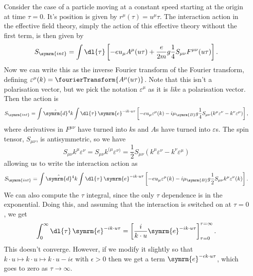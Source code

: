 \documentclass[fleqn]{NotesClass}
\newcommand{\e}{\symrm{e}}
\newcommand{\interaction}{{\symrm{int}}}
\newcommand{\dhat}[1]{\hat{\symrm{d}}{#1}}
\newcommand{\bohrMagneton}{\mu_{\symrm{B}}}
\begin{document}
    Consider the case of a particle moving at a constant speed starting at the origin at time \(\tau = 0\).
    It's position is given by \(r^\mu(\tau) = u^\mu \tau\).
    The interaction action in the effective field theory, simply the action of this effective theory without the first term, is then given by
    \begin{equation}
        S_{\interaction} = \int \dl{\tau} \left[ -e u_\mu A^\mu(u\tau) + \frac{e}{2m}g \frac{1}{4}S_{\mu\nu}F^{\mu\nu}(u\tau) \right].
    \end{equation}
    Now we can write this as the inverse Fourier transform of the Fourier transform, defining \(\varepsilon^\mu(k) = \fourierTransform\{A^\mu(u\tau)\}\).
    Note that this isn't a polarisation vector, but we pick the notation \(\varepsilon^\mu\) as it is \emph{like} a polarisation vector.
    Then the action is
    \begin{equation}
        S_{\interaction} = \int \dhat{^4k} \int \dl{\tau} \, \e^{-ik \cdot u\tau}\left[ -eu_\mu \varepsilon^\mu(k) - i\bohrMagneton g \frac{1}{4}S_{\mu\nu}(k^\mu \varepsilon^\nu - k^\nu \varepsilon^\mu) \right],
    \end{equation}
    where derivatives in \(F^{\mu\nu}\) have turned into \(k\)s and \(A\)s have turned into \(\varepsilon\)s.
    The spin tensor, \(S_{\mu\nu}\), is antisymmetric, so we have
    \begin{equation}
        S_{\mu\nu}k^\mu \varepsilon^\nu = S_{\mu\nu} k^{(\mu}\varepsilon^{\nu)} = \frac{1}{2}S_{\mu\nu}(k^\mu \varepsilon^\nu - k^\nu \varepsilon^\mu)
    \end{equation}
    allowing us to write the interaction action as
    \begin{equation}
        S_{\interaction} = \int\dhat{^4k} \int \dl{\tau} \, \e^{-ik\cdot u \tau}\left[ -e u_\mu \varepsilon^\mu(k) - i \bohrMagneton g \frac{1}{2}S_{\mu\nu}k^\mu \varepsilon^\nu(k) \right].
    \end{equation}
    We can also compute the \(\tau\) integral, since the only \(\tau\) dependence is in the exponential.
    Doing this, and assuming that the interaction is switched on at \(\tau = 0\), we get
    \begin{equation}
        \int_{0}^{\infty} \dl{\tau} \, \e^{-ik \cdot u \tau} = \left[ \frac{i}{k \cdot u} \e^{-ik \cdot u\tau} \right]_{\tau = 0}^{\tau = \infty}.
    \end{equation}
    This doesn't converge.
    However, if we modify it slightly so that \(k \cdot u \mapsto k \cdot u \mapsto k \cdot u - i\epsilon\) with \(\epsilon > 0\) then we get a term \(\e^{-\epsilon k \cdot u \tau}\), which goes to zero as \(\tau \to \infty\).
\end{document}
